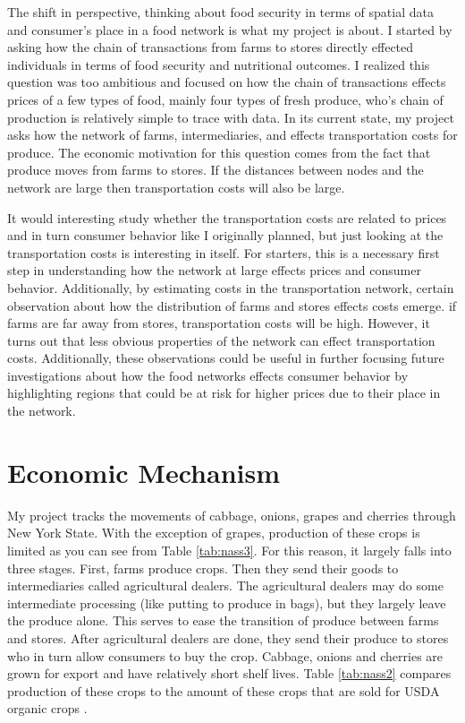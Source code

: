 \documentclass{report}
\begin{document}
The shift in perspective, thinking about food security in terms of spatial data and consumer's place in a food network is what my project is about. I started by asking how the chain of transactions from farms to stores directly effected individuals in terms of food security and nutritional outcomes. I realized this question was too ambitious and focused on how the chain of transactions effects prices of a few types of food, mainly four types of fresh produce, who's chain of production is relatively simple to trace with data. In its current state, my project asks how the network of farms, intermediaries, and effects transportation costs for produce. The economic motivation for this question comes from the fact that produce moves from farms to stores. If the distances between nodes and the network are large then transportation costs will also be large.

It would interesting study whether the transportation costs are related to prices and in turn consumer behavior like I originally planned, but just looking at the transportation costs is interesting in itself. For starters, this is a necessary first step in understanding how the network at large effects prices and consumer behavior. Additionally, by estimating costs in the transportation network, certain observation about how the distribution of farms and stores effects costs emerge.  if farms are far away from stores, transportation costs will be high. However, it turns out that less obvious properties of the network can effect transportation costs. Additionally, these observations could be useful in further focusing future investigations about how the food networks effects consumer behavior by highlighting regions that could be at risk for higher prices due to their place in the network.

\section{Economic Mechanism}

My project tracks the movements of cabbage, onions, grapes and cherries through New York State. With the exception of grapes, production of these crops is limited as you can see from Table \ref{tab:nass3}. For this reason, it largely falls into three stages. First, farms produce crops. Then they send their goods to intermediaries called agricultural dealers. The agricultural dealers may do some intermediate processing (like putting to produce in bags), but they largely leave the produce alone. This serves to ease the transition of produce between farms and stores. After agricultural dealers are done, they send their produce to stores who in turn allow consumers to buy the crop. Cabbage, onions and cherries are grown for export and have relatively short shelf lives. Table \ref{tab:nass2} compares production of these crops to the amount of these crops that are sold for USDA organic crops \cite{nass2}.  
\end{document}
